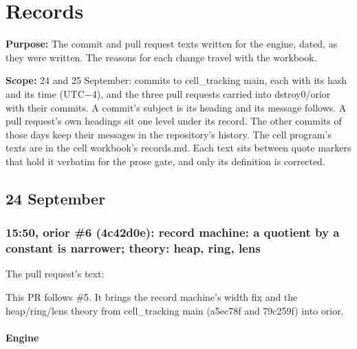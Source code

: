 \chapter{\texorpdfstring{Records}{Records}}
\label{chap:records}

\textbf{Purpose:} The commit and pull request texts written for the engine, dated, as they were written. The reasons for each change travel with the workbook.

\textbf{Scope:} 24 and 25 September: commits to cell\_\allowbreak{}tracking main, each with its hash and its time (UTC−4), and the three pull requests carried into dstroy0/orior with their commits. A commit's subject is its heading and its message follows. A pull request's own headings sit one level under its record. The other commits of those days keep their messages in the repository's history. The cell program's texts are in the cell workbook's records.md. Each text sits between quote markers that hold it verbatim for the prose gate, and only its definition is corrected.

\section{\texorpdfstring{24 September}{24 September}}

\subsection{\texorpdfstring{15:50, orior \#6 (4c42d0e): record machine: a quotient by a constant is narrower; theory: heap, ring, lens}{15:50, orior \#6 (4c42d0e): record machine: a quotient by a constant is narrower; theory: heap, ring, lens}}

The pull request's text:

This PR follows \#5. It brings the record machine's width fix and the heap/ring/lens theory from cell\_\allowbreak{}tracking main (a5ec78f and 79c259f) into orior.

\subsubsection{\texorpdfstring{Engine}{Engine}}

